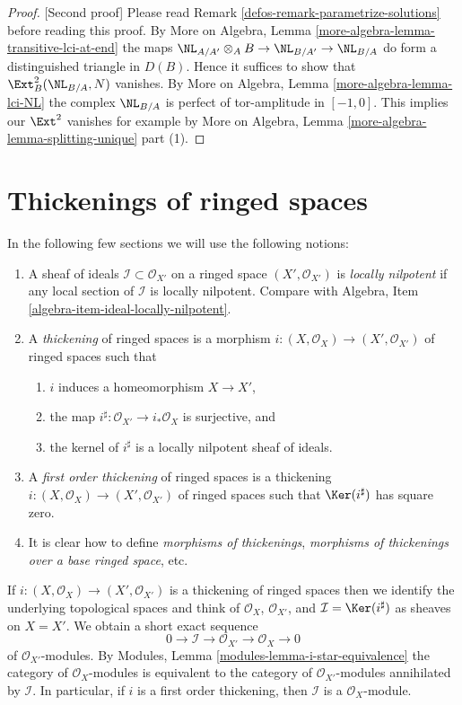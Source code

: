 \begin{proof}
[Second proof]
Please read Remark \ref{defos-remark-parametrize-solutions}
before reading this proof. By
More on Algebra, Lemma \ref{more-algebra-lemma-transitive-lci-at-end}
the maps $\NL_{A/A'} \otimes_A B \to \NL_{B/A'} \to \NL_{B/A}$
do form a distinguished triangle in $D(B)$.
Hence it suffices to show that $\Ext^2_B(\NL_{B/A}, N)$ vanishes.
By More on Algebra, Lemma \ref{more-algebra-lemma-lci-NL}
the complex $\NL_{B/A}$ is perfect of tor-amplitude in
$[-1, 0]$. This implies our $\Ext^2$ vanishes for example
by More on Algebra, Lemma \ref{more-algebra-lemma-splitting-unique} part (1).
\end{proof}

\section{Thickenings of ringed spaces}
\label{defos-section-thickenings-spaces}
In the following few sections we will use the following notions:
\begin{enumerate}
\item A sheaf of ideals $\mathcal{I} \subset \mathcal{O}_{X'}$ on
a ringed space $(X', \mathcal{O}_{X'})$ is {\it locally nilpotent}
if any local section of $\mathcal{I}$ is locally nilpotent.
Compare with Algebra, Item \ref{algebra-item-ideal-locally-nilpotent}.
\item A {\it thickening} of ringed spaces is a morphism
$i : (X, \mathcal{O}_X) \to (X', \mathcal{O}_{X'})$ of ringed spaces
such that
\begin{enumerate}
\item $i$ induces a homeomorphism $X \to X'$,
\item the map $i^\sharp : \mathcal{O}_{X'} \to i_*\mathcal{O}_X$
is surjective, and
\item the kernel of $i^\sharp$ is a locally nilpotent sheaf of ideals.
\end{enumerate}
\item A {\it first order thickening} of ringed spaces is a thickening
$i : (X, \mathcal{O}_X) \to (X', \mathcal{O}_{X'})$ of ringed spaces
such that $\Ker(i^\sharp)$ has square zero.
\item It is clear how to define {\it morphisms of thickenings},
{\it morphisms of thickenings over a base ringed space}, etc.
\end{enumerate}
If $i : (X, \mathcal{O}_X) \to (X', \mathcal{O}_{X'})$ is a thickening
of ringed spaces then we identify the underlying topological spaces
and think of $\mathcal{O}_X$, $\mathcal{O}_{X'}$, and
$\mathcal{I} = \Ker(i^\sharp)$ as sheaves on $X = X'$. We obtain
a short exact sequence
$$
0 \to \mathcal{I} \to \mathcal{O}_{X'} \to \mathcal{O}_X \to 0
$$
of $\mathcal{O}_{X'}$-modules. By
Modules, Lemma \ref{modules-lemma-i-star-equivalence}
the category of $\mathcal{O}_X$-modules is equivalent to the category
of $\mathcal{O}_{X'}$-modules annihilated by $\mathcal{I}$. In particular,
if $i$ is a first order thickening, then
$\mathcal{I}$ is a $\mathcal{O}_X$-module.

